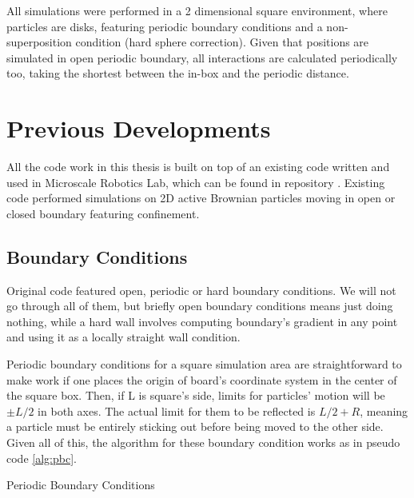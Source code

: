 \documentclass[../../master_thesis_np.tex]{subfiles}
\begin{document}
	All simulations were performed in a 2 dimensional square environment, where particles are disks, featuring periodic boundary conditions and a non-superposition condition (hard sphere correction). Given that positions are simulated in open periodic boundary, all interactions are calculated periodically too, taking the shortest between the in-box and the periodic distance.
	
	\section{Previous Developments}
	All the code work in this thesis is built on top of an existing code written and used in Microscale Robotics Lab, which can be found in repository \cite{sharma_simulations_2023}. Existing code performed simulations on 2D active Brownian particles moving in open or closed boundary featuring confinement. 
	
	\subsection{Boundary Conditions}
	Original code featured open, periodic or hard boundary conditions. We will not go through all of them, but briefly open boundary conditions means just doing nothing, while a hard wall involves computing boundary's gradient in any point and using it as a locally straight wall condition.
	
	Periodic boundary conditions for a square simulation area are straightforward to make work if one places the origin of board's coordinate system in the center of the square box. Then, if L is square's side, limits for particles' motion will be $\pm L/2$ in both axes. The actual limit for them to be reflected is $L/2 + R$, meaning a particle must be entirely sticking out before being moved to the other side. Given all of this, the algorithm for these boundary condition works as in pseudo code \ref{alg:pbc}.
	
	\begin{algorithm}[htp]
		\caption{Periodic Boundary Conditions} \label{alg:pbc}	
		\begin{algorithmic}[1]
			\EndIf
			\EndIf
			\EndFor
		\end{algorithmic}
	\end{algorithm}
	
\end{document}

